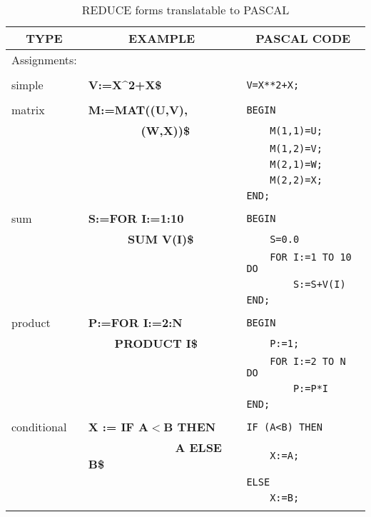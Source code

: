 \begin{table}
\begin{tabular}{||l|l|l||}\hline\hline
\multicolumn{1}{||c|}{\bf TYPE} & \multicolumn{1}{c|}{\bf EXAMPLE}
 & \multicolumn{1}{c||}{\bf PASCAL CODE} \\ \hline\hline
Assignments: & &\\
& & \\
    simple     &{\bf V:=X\^{}2+X\$} &\verb!V=X**2+X;!\\
& & \\
    matrix     &{\bf M:=MAT((U,V),} &\verb!BEGIN!\\
& {\bf \ \ \ \ \ \ \ \ (W,X))\$} &\verb!    M(1,1)=U;!\\
& &\verb!    M(1,2)=V;!\\
& &\verb!    M(2,1)=W;!\\
& &\verb!    M(2,2)=X;!\\
& &\verb!END;!\\
& & \\
    sum &{\bf S:=FOR I:=1:10} &\verb!BEGIN!\\
&{\bf\ \ \ \ \ \ SUM V(I)\$} &\verb!    S=0.0!\\
& &\verb!    FOR I:=1 TO 10 DO!\\
& &\verb!        S:=S+V(I)!\\
& &\verb!END;!\\
& & \\
    product    &{\bf P:=FOR I:=2:N} &\verb!BEGIN!\\
&{\bf \ \ \ \ PRODUCT I\$} &\verb!    P:=1;!\\
& &\verb!    FOR I:=2 TO N DO!\\
& &\verb!        P:=P*I!\\
& &\verb!END;!\\
& & \\
conditional & {\bf X := IF A$<$B THEN} &\verb!IF (A<B) THEN!\\
& \ \ \ \ \ \ {\bf \ \ \ \ \ \ \ \ A ELSE B\$} &\verb!    X:=A;!\\
& &\verb!ELSE!\\
& &\verb!    X:=B;!\\
& & \\\hline\hline
\end{tabular}
\caption{REDUCE forms translatable to PASCAL}
\end{table}

